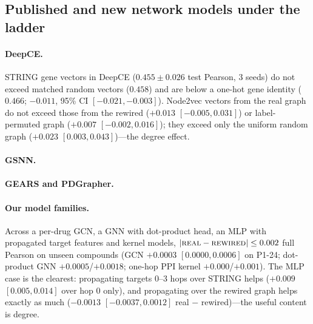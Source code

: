\subsection{Published and new network models under the ladder}
\label{sec:audit}

\paragraph{DeepCE.}
STRING gene vectors in DeepCE ($0.455 \pm 0.026$ test Pearson, 3 seeds) do not exceed matched random
vectors ($0.458$) and are below a one-hot gene identity ($0.466$; $-0.011$, 95\% CI $[-0.021,-0.003]$).
Node2vec vectors from the real graph do not exceed those from the rewired ($+0.013$ $[-0.005,0.031]$)
or label-permuted graph ($+0.007$ $[-0.002,0.016]$); they exceed only the uniform random graph
($+0.023$ $[0.003,0.043]$)---the degree effect.

\paragraph{GSNN.}

\paragraph{GEARS and PDGrapher.}

\paragraph{Our model families.}
Across a per-drug GCN, a GNN with dot-product head, an MLP with propagated target features and kernel
models, $|\textsc{real}{} - \textsc{rewired}{}| \leq 0.002$ full Pearson on unseen compounds (GCN $+0.0003$
$[0.0000, 0.0006]$ on P1-24; dot-product GNN $+0.0005$/$+0.0018$; one-hop PPI kernel $+0.000$/$+0.001$).
The MLP case is the clearest: propagating targets 0--3 hops over STRING helps ($+0.009$
$[0.005, 0.014]$ over hop 0 only), and propagating over the rewired graph helps exactly as much
($-0.0013$ $[-0.0037, 0.0012]$ real $-$ rewired)---the useful content is degree.  

